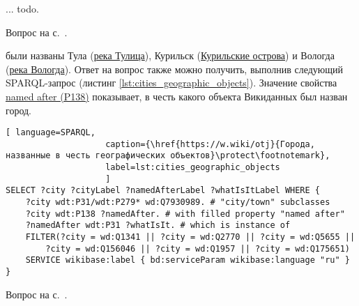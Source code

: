 \begin{task}
    \label{answer:global-vars-pros-cons}
     ... todo. 

    \small{Вопрос на с.~\pageref{fig:block:proc:swap:colors}.}
\end{task}

\begin{task}
    \label{answer:cities_geographic_objects}
     были названы Тула (\href{https://w.wiki/oLJ}{река Тулица}), Курильск (\href{https://w.wiki/oLH}{Курильские острова}) и Вологда (\href{https://w.wiki/oLG}{река Вологда}). Ответ на вопрос также можно получить, выполнив следующий SPARQL-запрос (листинг \ref{lst:cities_geographic_objects}). Значение свойства \href{https://www.wikidata.org/wiki/Property:P138}{named after (P138)} показывает, в честь какого объекта Викиданных был назван город.
    
    
    \begin{lstlisting}[ language=SPARQL, 
                    caption={\href{https://w.wiki/otj}{Города, названные в честь географических объектов}\protect\footnotemark},
                    label=lst:cities_geographic_objects
                    ]
SELECT ?city ?cityLabel ?namedAfterLabel ?whatIsItLabel WHERE {
	?city wdt:P31/wdt:P279* wd:Q7930989. # "city/town" subclasses
	?city wdt:P138 ?namedAfter. # with filled property "named after"
	?namedAfter wdt:P31 ?whatIsIt. # which is instance of
	FILTER(?city = wd:Q1341 || ?city = wd:Q2770 || ?city = wd:Q5655 ||
		?city = wd:Q156046 || ?city = wd:Q1957 || ?city = wd:Q175651)
	SERVICE wikibase:label { bd:serviceParam wikibase:language "ru" }
}
    \end{lstlisting}
    \small{Вопрос на с.~\pageref{lst:population_town}.}
\end{task}

